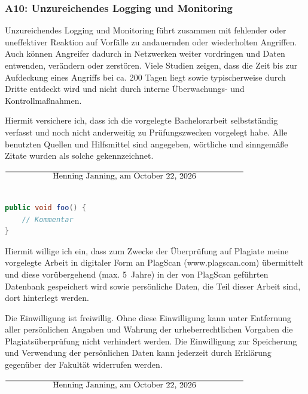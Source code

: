 \documentclass[12pt,oneside,a4paper,parskip]{scrbook}
\def\BaAuthor{Henning Janning}
\begin{document}
    \subsubsection{A10: Unzureichendes Logging und Monitoring}
    Unzureichendes Logging und Monitoring führt zusammen mit fehlender oder uneffektiver Reaktion auf Vorfälle zu andauernden oder wiederholten Angriffen. Auch können Angreifer dadurch in Netzwerken weiter vordringen und Daten entwenden, verändern oder zerstören. Viele Studien zeigen, dass die Zeit bis zur Aufdeckung eines Angriffs bei ca. 200 Tagen liegt sowie typischerweise durch Dritte entdeckt wird und nicht durch interne Überwachungs- und Kontrollmaßnahmen.

\cite{OWASPtop10}









Hiermit versichere ich, dass ich die vorgelegte Bachelorarbeit selbstständig verfasst und noch nicht anderweitig zu Prüfungszwecken vorgelegt habe. Alle benutzten Quellen und Hilfsmittel sind angegeben, wörtliche und sinngemäße Zitate wurden als solche gekennzeichnet.

\vspace{20pt}
\begin{flushright}
$\overline{~~~~~~~~~~~~~~~~~\mbox{\BaAuthor, am \today}~~~~~~~~~~~~~~~~~}$
\end{flushright}

\begin{lstlisting}[label=lst:java,
				   language=java,
				   firstnumber=1,
				   caption=Beispiel für einen Quelltext]

public void foo() {
	// Kommentar
}
\end{lstlisting}








Hiermit willige ich ein, dass zum Zwecke der Überprüfung auf Plagiate meine vorgelegte Arbeit in digitaler Form an PlagScan (www.plagscan.com) übermittelt und diese vorübergehend (max. 5~Jahre) in der von PlagScan geführten Datenbank gespeichert wird sowie persönliche Daten, die Teil dieser Arbeit sind, dort hinterlegt werden.

\begin{small}
Die Einwilligung ist freiwillig. Ohne diese Einwilligung kann unter Entfernung aller persönlichen Angaben und Wahrung der urheberrechtlichen Vorgaben die Plagiatsüberprüfung nicht verhindert werden. Die Einwilligung zur Speicherung und Verwendung der persönlichen Daten kann jederzeit durch Erklärung gegenüber der Fakultät widerrufen werden.
\end{small}

\vspace{20pt}
\begin{flushright}
$\overline{~~~~~~~~~~~~~~~~~\mbox{\BaAuthor, am \today}~~~~~~~~~~~~~~~~~}$
\end{flushright}
\end{document}
